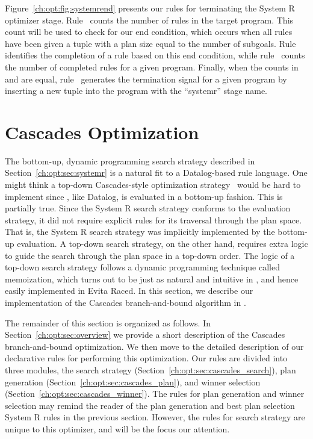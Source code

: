 Figure~\ref{ch:opt:fig:systemrend} presents our rules for terminating the
System R optimizer stage.  Rule~ counts the number of rules in the target
program.  This count will be used to check for our end condition, which occurs
when all rules have been given a  tuple with a plan size equal to
the number of subgoals.  Rule~ identifies the completion of a rule based
on this end condition, while rule~ counts the number of completed rules
for a given program.  Finally, when the counts in  and
 are equal, rule~ generates the termination signal for a given
program by inserting a new tuple into the  program with the ``systemr''
stage name.

\section{Cascades Optimization}
\label{ch:opt:sec:cascades}

The bottom-up, dynamic programming search strategy described in
Section~\ref{ch:opt:sec:systemr} is a natural fit to a Datalog-based rule
language.  One might think a top-down Cascades-style optimization
strategy~\cite{cascades} would be hard to implement since \OVERLOG, like
Datalog, is evaluated in a bottom-up fashion.  This is partially true.  Since
the System R search strategy conforms to the \OVERLOG evaluation strategy, it
did not require explicit rules for its traversal through the plan space.  That is,
the System R search strategy was implicitly implemented by the \OVERLOG
bottom-up evaluation.  A top-down search strategy, on the other hand, requires
extra logic to guide the search through the plan space in
a top-down order.  The logic of a top-down search strategy follows a dynamic
programming technique called memoization, which turns out to be just as natural
and intuitive in \OVERLOG, and hence easily implemented in Evita
Raced.  In this section, we describe our implementation of the Cascades
branch-and-bound algorithm in \OVERLOG.

The remainder of this section is organized as follows.  In
Section~\ref{ch:opt:sec:overview} we provide a short description of the
Cascades branch-and-bound optimization.  We then move to the detailed
description of our declarative rules for performing this optimization.  Our
rules are divided into three modules, the search strategy
(Section~\ref{ch:opt:sec:cascades_search}), plan generation
(Section~\ref{ch:opt:sec:cascades_plan}), and winner selection
(Section~\ref{ch:opt:sec:cascades_winner}).  The rules for plan generation and
winner selection may remind the reader of the plan generation and best plan
selection System R rules in the previous section.  However, the rules for
search strategy are unique to this optimizer, and will be the focus our
attention.

